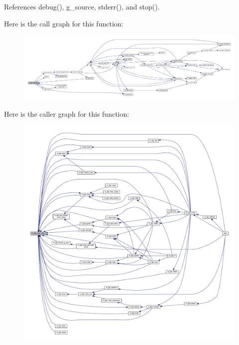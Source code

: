 References debug(), g\+\_\+source, stderr(), and stop().

Here is the call graph for this function\+:
\nopagebreak
\begin{figure}[H]
\begin{center}
\leavevmode
\includegraphics[width=350pt]{namespacem__fpp_a0cff320eaa7ee0c4ed98a6ecb9ecee0b_cgraph}
\end{center}
\end{figure}
Here is the caller graph for this function\+:
\nopagebreak
\begin{figure}[H]
\begin{center}
\leavevmode
\includegraphics[width=350pt]{namespacem__fpp_a0cff320eaa7ee0c4ed98a6ecb9ecee0b_icgraph}
\end{center}
\end{figure}
\mbox{\label{namespacem__fpp_a66a3f9b0087d5808a36fe4c19c47b51c}} 
